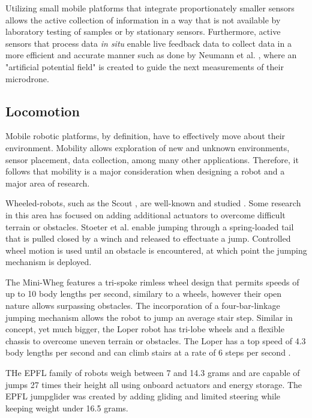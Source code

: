 		Utilizing small mobile platforms that integrate proportionately smaller sensors allows the active collection of information in a way that is not available by laboratory testing of samples or by stationary sensors. Furthermore, active sensors that process data \emph{in situ} enable live feedback data to collect data in a more efficient and accurate manner such as done by Neumann et al. \cite{Neumann2012}, where an "artificial potential field" is created to guide the next measurements of their microdrone. 
		

	
	\subsection{Locomotion}%
	\label{sec:locomotion} 

		Mobile robotic platforms, by definition, have to effectively move about their environment. Mobility allows exploration of new and unknown environments, sensor placement, data collection, among many other applications. Therefore, it follows that mobility is a major consideration when designing a robot and a major area of research. 

		Wheeled-robots, such as the Scout \cite{Rybski2000}, are well-known and studied \cite{Soetanto2003}. Some research in this area has focused on adding additional actuators to overcome difficult terrain or obstacles. Stoeter et al. \cite{Stoeter2006} enable jumping through a spring-loaded tail that is pulled closed by a winch and released to effectuate a jump. Controlled wheel motion is used until an obstacle is encountered, at which point the jumping mechanism is deployed. 

		The Mini-Wheg \cite{Morrey2003} features a tri-spoke rimless wheel design that permits speeds of up to 10 body lengths per second, similary to a wheels, however their open nature allows surpassing obstacles. The incorporation of a four-bar-linkage jumping mechanism allows the robot to jump an average stair step. Similar in concept, yet much bigger, the Loper robot \cite{Herbert2008} has tri-lobe wheels and a flexible chassis to overcome uneven terrain or obstacles. The Loper has a top speed of 4.3 body lengths per second and can climb stairs at a rate of 6 steps per second \cite{Herbert2009}.  

		THe EPFL family of robots \cite{MirkoKovac2010} weigh between 7 and 14.3 grams and are capable of jumps 27 times their height all using onboard actuators and energy storage. The EPFL jumpglider was created by adding gliding and limited steering while keeping weight under 16.5 grams.

